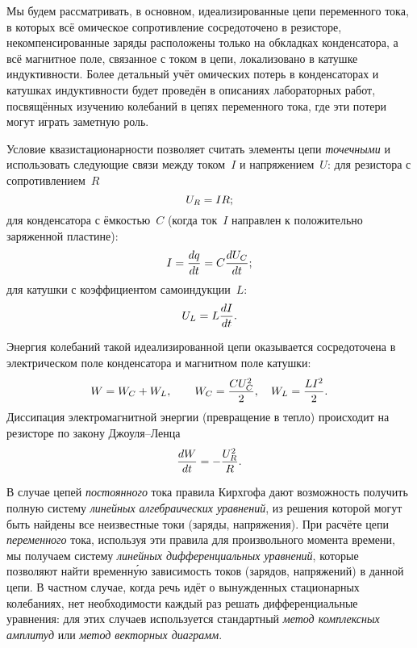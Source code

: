 Мы будем рассматривать, в основном, идеализированные цепи переменного тока,
в которых всё омическое сопротивление сосредоточено в резисторе,
некомпенсированные заряды расположены только на обкладках конденсатора, а всё
магнитное поле, связанное с током в цепи, локализовано в катушке индуктивности.
Более детальный учёт омических потерь в конденсаторах и катушках индуктивности
будет проведён в описаниях лабораторных работ, посвящённых изучению колебаний в
цепях переменного тока, где эти потери могут играть заметную роль.

Условие квазистационарности позволяет считать элементы цепи
\emph{точечными} и использовать следующие связи между током~$I$ и
напряжением~$U$:
для резистора с сопротивлением~$R$
\begin{equation}
	\eqmark{2.1}
	U_R=IR;
\end{equation}
для конденсатора с ёмкостью~$C$ (когда ток~$I$ направлен к положительно
заряженной пластине):
\begin{equation}
	\eqmark{2.2}
	I=\dfrac{dq}{dt}=C\dfrac{dU_C}{dt};
\end{equation}
для катушки с коэффициентом самоиндукции~$L$:
\begin{equation}
	\eqmark{2.3}
	U_L=L\dfrac{dI}{dt}.
\end{equation}

Энергия колебаний такой идеализированной цепи оказывается сосредоточена 
в электрическом поле конденсатора и магнитном поле катушки:
\begin{equation}
\eqmark{W}
W = W_C + W_L,\qquad W_C = \frac{CU_C^2}{2},\quad W_L=\frac{LI^2}{2}.
\end{equation}
Диссипация электромагнитной энергии (превращение в тепло) происходит 
на резисторе по закону Джоуля--Ленца 
\begin{equation}
\eqmark{JL}
    \frac{dW}{dt} = -\frac{U_R^2}{R}.
\end{equation}

В случае цепей \emph{постоянного} тока правила Кирхгофа дают возможность получить
полную систему \emph{линейных алгебраических уравнений}, из решения которой могут быть
найдены все неизвестные токи (заряды, напряжения). При расчёте цепи 
\emph{переменного}
тока, используя эти правила для произвольного момента времени, мы получаем
систему \emph{линейных дифференциальных уравнений}, которые позволяют найти 
временн\'{у}ю
зависимость токов (зарядов, напряжений) в данной цепи. В частном случае, когда
речь идёт о вынужденных стационарных колебаниях, нет необходимости каждый раз
решать дифференциальные уравнения: для этих случаев используется стандартный
\emph{метод комплексных амплитуд} или \emph{метод векторных диаграмм}.


